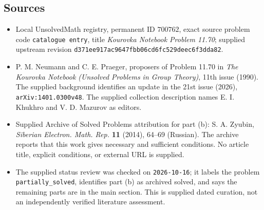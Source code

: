 \documentclass[11pt]{article}
\begin{document}
\subsection{Sources}
\begin{itemize}
\item Local UnsolvedMath registry, permanent ID \(700762\), exact source problem code \texttt{catalogue entry}, title \emph{Kourovka Notebook Problem 11.70}; supplied upstream revision \texttt{d371ee917ac9647fbb06cd6fc529deec6f3dda82}.
\item P. M. Neumann and C. E. Praeger, proposers of Problem 11.70 in \emph{The Kourovka Notebook (Unsolved Problems in Group Theory)}, 11th issue (1990). The supplied background identifies an update in the 21st issue (2026), \texttt{arXiv:1401.0300v48}. The supplied collection description names E. I. Khukhro and V. D. Mazurov as editors.
\item Supplied Archive of Solved Problems attribution for part (b): S. A. Zyubin, \emph{Siberian Electron. Math. Rep.} \textbf{11} (2014), 64--69 (Russian). The archive reports that this work gives necessary and sufficient conditions. No article title, explicit conditions, or external URL is supplied.
\item The supplied status review was checked on \texttt{2026-10-16}; it labels the problem \texttt{partially\_solved}, identifies part (b) as archived solved, and says the remaining parts are in the main section. This is supplied dated curation, not an independently verified literature assessment.
\end{itemize}
\end{document}
